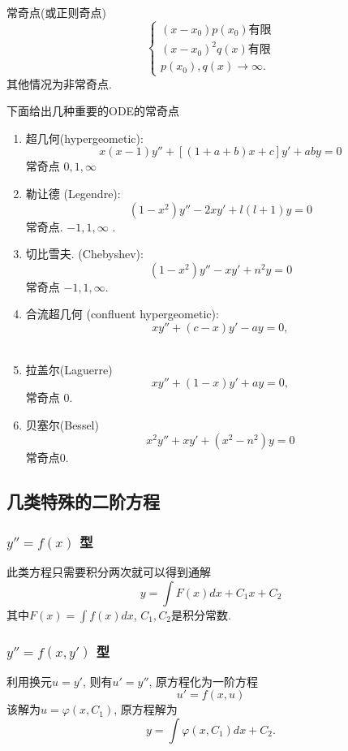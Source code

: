 常奇点(或正则奇点) $$\left\{\begin{array}{l}
    \left(x-x_0\right) p\left(x_0\right) \text{有限}
    \\
    \left(x-x_0\right)^2 q(x) \text{有限}
    \\ p\left(x_0\right), q(x) \rightarrow \infty .\end{array}
    \right.$$
其他情况为非常奇点.


下面给出几种重要的ODE的常奇点
\begin{enumerate}
    \item 超几何(hypergeometic):
    $$
    x(x-1) y''+[(1+a+b) x+c] y'+a b y= 0
    $$
    常奇点 $0,1, \infty$\\
    \item 勒让德 (Legendre):
    $$
    \left(1-x^2\right) y''-2 x y'+l(l+1) y=0
    $$
    常奇点. $-1,1, \infty$ .\\
    \item  切比雪夫. (Chebyshev):
    $$
    \left(1-x^2\right) y''-x y'+n^2 y=0 
    $$
    常奇点 $-1,1, \infty$.\\

    \item  合流超几何 (confluent hypergeometic):
    $$
    x y''+(c-x) y'-a y=0,
    $$
    \\
    \item 拉盖尔(Laguerre)
    $$
    x y''+(1-x) y'+a y=0,
    $$
    常奇点 $0$.
    \item 贝塞尔(Bessel)
    $$
    x^2 y'' + xy' + (x^2 - n^2) y = 0
    $$
    常奇点$0$.
\end{enumerate}


\subsection{几类特殊的二阶方程}
\subsubsection{ $y'' = f(x)$ 型}
此类方程只需要积分两次就可以得到通解
\begin{equation}
    y = \int F(x) dx + C_1 x + C_2
\end{equation}
其中$F(x) = \int f(x) dx$, $C_1, C_2$是积分常数.
\subsubsection{ $y'' = f(x, y')$ 型}
利用换元$u = y'$, 则有$u' = y''$, 原方程化为一阶方程
$$ u' = f(x,u)$$
该解为$u = \varphi(x, C_1)$, 原方程解为
\begin{equation}
    y = \int \varphi(x, C_1) dx  + C_2.
\end{equation}



